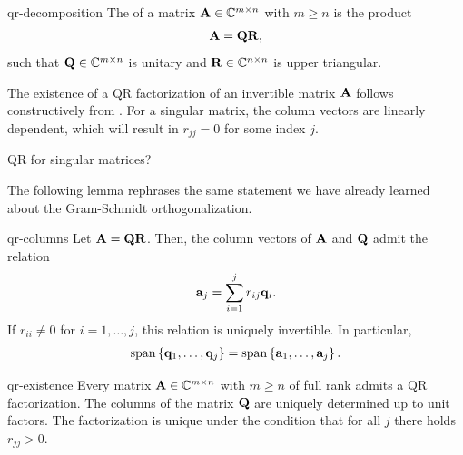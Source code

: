\begin{Definition}{qr-decomposition}
  The  of a matrix $\mathbf A\in\mathbb C^{m\times n}$
  with $m\ge n$ is the product
  \begin{gather}
    \mathbf A = \mathbf Q\mathbf R,
  \end{gather}
  such that $\mathbf Q \in\mathbb C^{m\times n}$ is unitary and
  $\mathbf R\in \mathbb C^{n\times n}$ is upper triangular.
\end{Definition}

\begin{intro}
  The existence of a QR factorization of an invertible matrix $\mathbf A$
  follows constructively from . For a
  singular matrix, the column vectors are linearly dependent, which
  will result in $r_{jj}=0$ for some index $j$.
\begin{todo} %
    QR for singular matrices?
\end{todo}
  The following lemma rephrases the same statement we have already
  learned about the Gram-Schmidt orthogonalization.
\end{intro}

\begin{Lemma}{qr-columns}
  Let $\mathbf A = \mathbf Q\mathbf R$. Then, the column vectors of $\mathbf A$ and
  $\mathbf Q$ admit the relation
  \begin{gather}
    \mathbf a_j = \sum_{i=1}^j r_{ij} \mathbf q_i.
  \end{gather}
  If $r_{ii}\neq 0$ for $i=1,\dots,j$, this relation is uniquely
  invertible. In particular,
  \begin{gather}
    \operatorname{span}\left\{\mathbf q_1,\dots,\mathbf q_j\right\}
    =
    \operatorname{span}\left\{\mathbf a_1,\dots,\mathbf a_j\right\}.
  \end{gather}
\end{Lemma}

\begin{Theorem}{qr-existence}
  Every matrix $\mathbf A\in\mathbb C^{m\times n}$ with $m\ge n$ of full rank
  admits a QR factorization. The columns of the matrix $\mathbf Q$ are
  uniquely determined up to unit factors. The factorization is unique
  under the condition that for all $j$ there holds $r_{jj} > 0$.
\end{Theorem}


